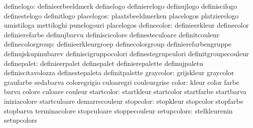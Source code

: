                       definelogo: definieerbeeldmerk               definelogo
                                  definierelogo                    definujlogo
                                  definiscilogo                    definestelogo
                                  definitlogo
                      placelogos: plaatsbeeldmerken                placelogos
                                  platzierelogo                    umistiloga
                                  mettiloghi                       punelogouri
                                  placelogos
                     definecolor: definieerkleur                   definecolor
                                  definierefarbe                   definujbarvu
                                  definiscicolore                  definesteculoare
                                  definitcouleur
                definecolorgroup: definieerkleurgroep              definecolorgroup
                                  definierefarbengruppe            definujskupinubarev
                                  definiscigruppocolori            definestegrupculori
                                  definitgroupecouleur
                     definepalet: definieerpalet                   definepalet
                                  definierepalette                 definujpaletu
                                  definiscitavolozza               definestepaleta
                                  definitpalette
                       graycolor: grijskleur                       graycolor
                                  graufarbe                        sedabarva
                                  coloregrigio                     culoaregri
                                  couleurgrise
                           color: kleur                            color
                                  farbe                            barva
                                  colore                           culoare
                                  couleur
                      startcolor: startkleur                       startcolor
                                  startfarbe                       startbarva
                                  iniziacolore                     startculoare
                                  demarrecouleur
                       stopcolor: stopkleur                        stopcolor
                                  stopfarbe                        stopbarva
                                  terminacolore                    stopculoare
                                  stoppecouleur
                     setupcolors: stelkleurenin                    setupcolors
